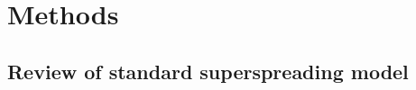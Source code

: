 \documentclass{imammb}
\numberwithin{equation}{section}
\begin{document}

 


 



\section{Methods}

\subsection{Review of standard superspreading model}

\end{document}
